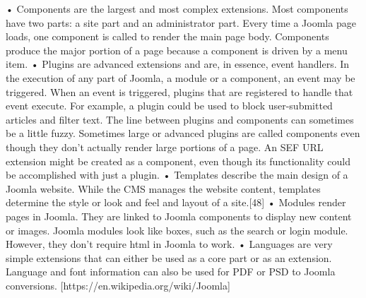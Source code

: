 	•	Components are the largest and most complex extensions. Most components have two parts: a site part and an administrator part. Every time a Joomla page loads, one component is called to render the main page body. Components produce the major portion of a page because a component is driven by a menu item.
	•	Plugins are advanced extensions and are, in essence, event handlers. In the execution of any part of Joomla, a module or a component, an event may be triggered. When an event is triggered, plugins that are registered to handle that event execute. For example, a plugin could be used to block user-submitted articles and filter text. The line between plugins and components can sometimes be a little fuzzy. Sometimes large or advanced plugins are called components even though they don't actually render large portions of a page. An SEF URL extension might be created as a component, even though its functionality could be accomplished with just a plugin.
	•	Templates describe the main design of a Joomla website. While the CMS manages the website content, templates determine the style or look and feel and layout of a site.[48]
	•	Modules render pages in Joomla. They are linked to Joomla components to display new content or images. Joomla modules look like boxes, such as the search or login module. However, they don’t require html in Joomla to work.
	•	Languages are very simple extensions that can either be used as a core part or as an extension. Language and font information can also be used for PDF or PSD to Joomla conversions. [https://en.wikipedia.org/wiki/Joomla]
